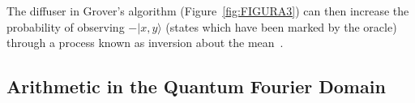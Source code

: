 \documentclass[twocolumn]{cinc}
\begin{document}
  The diffuser in Grover's algorithm (Figure~\ref{fig:FIGURA3}) can then increase the 
  probability of observing $-|x,y\rangle$ (states which have been marked by the oracle) 
  through a process known as inversion about the mean~\cite{grover}.


  




  \subsection{Arithmetic in the Quantum Fourier Domain}\label{sec:qft_arithmetic} 
\end{document}
